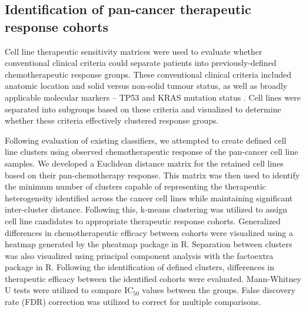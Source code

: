 \documentclass[10pt, letterpaper, twocolumn]{article}
\begin{document}
\subsection{Identification of pan-cancer therapeutic response cohorts}
Cell line therapeutic sensitivity matrices were used to evaluate whether conventional clinical criteria could separate patients into previously-defined chemotherapeutic response groups. These conventional clinical criteria included anatomic location and solid versus non-solid tumour status, as well as broadly applicable molecular markers -- TP53 and KRAS mutation status \cite{colorectal, gi, lung, breast}. Cell lines were separated into subgroups based on these criteria and visualized to determine whether these criteria effectively clustered response groups.

Following evaluation of existing classifiers, we attempted to create defined cell line clusters using observed chemotherapeutic response of the pan-cancer cell line samples. We developed a Euclidean distance matrix for the retained cell lines based on their pan-chemotherapy response. This matrix was then used to identify the minimum number of clusters capable of representing the therapeutic heterogeneity identified across the cancer cell lines while maintaining significant inter-cluster distance. Following this, k-means clustering was utilized to assign cell line candidates to appropriate therapeutic response cohorts. Generalized differences in chemotherapeutic efficacy between cohorts were visualized using a heatmap generated by the pheatmap package \cite{pheatmap} in R. Separation between clusters was also visualized using principal component analysis with the factoextra package \cite{factoextra} in R. Following the identification of defined clusters, differences in therapeutic efficacy between the identified cohorts were evaluated. Mann-Whitney U tests were utilized to compare IC$_{50}$ values between the groups. False discovery rate (FDR) correction was utilized to correct for multiple comparisons.
\end{document}
